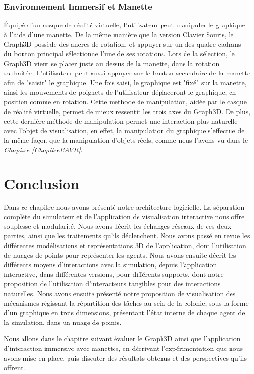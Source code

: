 		\subsubsection{Environnement Immersif et Manette}
		Équipé d'un casque de réalité virtuelle, l'utilisateur peut manipuler le graphique à l'aide d'une manette. De la même manière que la version Clavier Souris, le Graph3D possède des ancres de rotation, et appuyer sur un des quatre cadrans du bouton principal sélectionne l'une de ses rotations. Lors de la sélection, le Graph3D vient se placer juste au dessus de la manette, dans la rotation souhaitée. L'utilisateur peut aussi appuyer sur le bouton secondaire de la manette afin de "saisir" le graphique. Une fois saisi, le graphique est "fixé" sur la manette, ainsi les mouvements de poignets de l'utilisateur déplaceront le graphique, en position comme en rotation. Cette méthode de manipulation, aidée par le casque de réalité virtuelle, permet de mieux ressentir les trois axes du Graph3D. De plus, cette dernière méthode de manipulation permet une interaction plus naturelle avec l'objet de visualisation, en effet, la manipulation du graphique s'effectue de la même façon que la manipulation d'objets réels, comme nous l'avons vu dans le \textit{Chapitre \ref{ChapitreEAVR}}.
		
	
	
			
	\section*{Conclusion}
	Dans ce chapitre nous avons présenté notre architecture logicielle. La séparation complète du simulateur et de l'application de visualisation interactive nous offre souplesse et modularité. Nous avons décrit les échanges réseaux de ces deux parties, ainsi que les traitements qu'ils déclenchent. Nous avons passé en revue les différentes modélisations et représentations 3D de l'application, dont l'utilisation de nuages de points pour représenter les agents. Nous avons ensuite décrit les différents moyens d'interactions avec la simulation, depuis l'application interactive, dans différentes versions, pour différents supports, dont notre proposition de l'utilisation d'interacteurs tangibles pour des interactions naturelles.
	Nous avons ensuite présenté notre proposition de visualisation des mécanismes régissant la répartition des tâches au sein de la colonie, sous la forme d'un graphique en trois dimensions, présentant l'état interne de chaque agent de la simulation, dans un nuage de points.
	
	 Nous allons dans le chapitre suivant évaluer le Graph3D ainsi que l'application d'interaction immersive avec manettes, en décrivant l'expérimentation que nous avons mise en place, puis discuter des résultats obtenus et des perspectives qu'ils offrent.
	